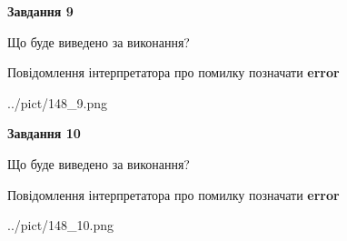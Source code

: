 \documentclass[12pt, ukrainian]{article}
\begin{document}
{{\begin {center}\textbf{Завдання 9}\end {center}}\par
Що буде виведено за виконання? \par
Повідомлення інтерпретатора про помилку позначати \textbf{error}

\begin{center}
	{../pict/148_9.png}
\end{center}
\newpage

{\begin {center}\textbf{Завдання 10}\end {center}}\par
Що буде виведено за виконання? \par
Повідомлення інтерпретатора про помилку позначати \textbf{error}

\begin{center}
	{../pict/148_10.png}
\end{center}
\newpage

}
\end{document}
